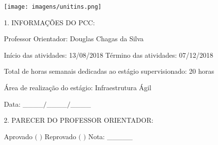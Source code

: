 
\imprimircapa

\imprimirfolhaderosto


%
% 
%
\begin{folhadeaprovacao}

 		\texttt{[image: imagens/unitins.png]}
  		
				
  
  		
  		
  		\par
  		\vspace*{0.5cm}     
  		  
  		\ABNTEXchapterfont\large   1. INFORMAÇÕES DO PCC:
		  		\normalsize 
		
		Professor Orientador: Douglas Chagas da Silva
		
		Início das atividades: 13/08/2018 \tab \tab Término das atividades: 07/12/2018
		
		Total de horas semanais dedicadas ao estágio supervisionado: 20 horas
		
		Área de realização do estágio: Infraestrutura Ágil
		
		
		Data: \_\_\_\_$/$\_\_\_\_$/$\_\_\_\_
		\par
		\vspace*{0.5cm}

  		\ABNTEXchapterfont\large   2. PARECER DO PROFESSOR ORIENTADOR:
  		\normalsize 
  		
  		Aprovado $($ \tab $)$ \tab \tab Reprovado $($ \tab $)$  \tab \tab Nota: \_\_\_\_\_
  		

\end{folhadeaprovacao}
